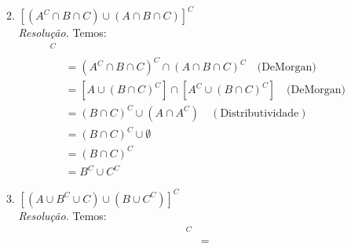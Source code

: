 \documentclass[13pt,letterpaper]{article}
\begin{document}
\begin{enumerate}
\begin{enumerate}
\begin{align*}
        \end{align*}
        \item $[(A^C \cap B \cap C) \cup (A \cap B \cap C)]^C$ \\
        \emph{Resolução.} Temos:
        \begin{align*}
            [(A^C \cap B \cap C) &\cup (A \cap B \cap C)]^C\\ &=
            (A^C \cap B \cap C)^C \cap (A \cap B \cap C)^C \quad \text{(DeMorgan)} \\ &=
            [A \cup (B \cap C)^C] \cap [A^C \cup (B \cap C)^C] \quad \text{(DeMorgan)} \\ &=
            (B \cap C)^C \cup (A \cap A^C) \quad (\text{Distributividade}) \\ &=
            (B \cap C)^C \cup \emptyset \\ &=
            (B \cap C)^C \\ &=
            B^C \cup C^C
         \end{align*}
        \item $[(A \cup B^C \cup C) \cup (B \cup C^C)]^C$ \\ 
        \emph{Resolução.} Temos:
        \begin{align*}
            [(A \cup B^C \cup C) &\cup (B \cup C^C)]^C \\ &=

\end{align*}
\end{enumerate}
\end{enumerate}
\end{document}

